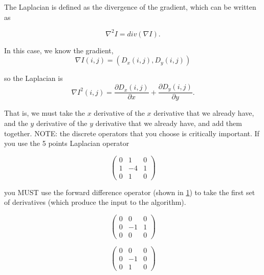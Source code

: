 \documentclass{InsightArticle}
\begin{document}
The Laplacian is defined as the divergence of the gradient, which can be written as

\begin{equation}
\nabla^2 I = div(\nabla I).
\end{equation}

In this case, we know the gradient,
\begin{equation}
\nabla I (i,j) = (D_x(i,j), D_y(i,j)) 
\end{equation}

so the Laplacian is 
\begin{equation}
\nabla I^2(i,j) = \frac{\partial D_x(i,j)}{\partial x} + \frac{\partial D_y(i,j)}{\partial y}.
\end{equation}

That is, we must take the $x$ derivative of the $x$ derivative that we already have, and the $y$ derivative of the $y$ derivative that we already have, and add them together. NOTE: the discrete operators that you choose is critically important. If you use the 5 points Laplacian operator

\begin{equation}
\begin{pmatrix}
0 & 1 & 0 \\
1 & -4 & 1\\
0 & 1 & 0
\end{pmatrix}
\end{equation}

you MUST use the forward difference operator (shown in \ref{eqn:ForwardDifference}) to take the first set of derivatives (which produce the input to the algorithm).

\begin{figure}[H]
\label{eqn:ForwardDifference}
  \begin{minipage}[b]{0.5\linewidth}
    \centering

    \begin{equation}
    \begin{pmatrix}
    0 & 0 & 0 \\
    0 & -1 & 1\\
    0 & 0 & 0
    \end{pmatrix}
    \end{equation}

  \end{minipage}
    \hspace{0.5cm}
  \begin{minipage}[b]{0.5\linewidth}

    \begin{equation}
    \begin{pmatrix}
    0 & 0 & 0 \\
    0 & -1 & 0\\
    0 & 1 & 0
    \end{pmatrix}
    \end{equation}
  \end{minipage}
\end{figure}
\end{document}

